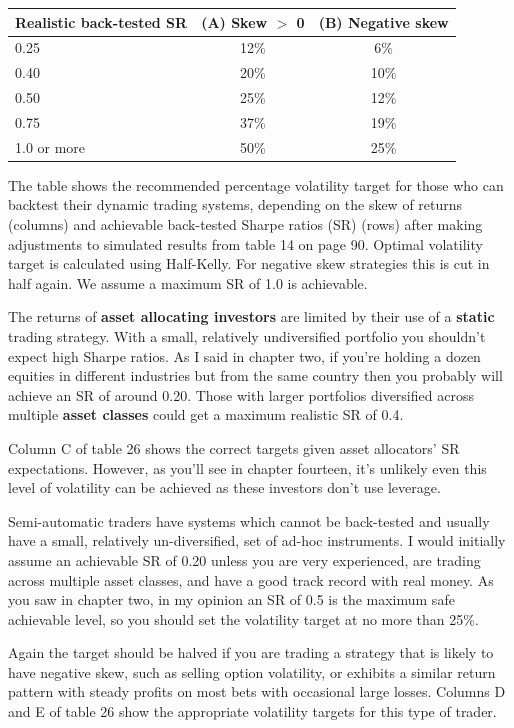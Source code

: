  \begingroup \small \centering \begin{tabular}{@{} lcc@{}}
\toprule
Realistic back-tested SR & (A) Skew $>$ 0 & (B) Negative skew \\
\midrule
0.25 & 12\% & 6\% \\
0.40 & 20\% & 10\% \\
0.50 & 25\% & 12\% \\
0.75 & 37\% & 19\% \\
1.0 or more & 50\% & 25\% \\
\bottomrule
\end{tabular}
\par \endgroup

The table shows the recommended percentage volatility target for those who can backtest their dynamic trading systems, depending on the skew of returns (columns) and achievable back-tested Sharpe ratios (SR) (rows) after making adjustments to simulated results from table 14 on page 90. Optimal volatility target is calculated using Half-Kelly. For negative skew strategies this is cut in half again. We assume a maximum SR of 1.0 is achievable.

The returns of \textbf{asset allocating investors} are limited by their use of a \textbf{static} trading strategy. With a small, relatively undiversified portfolio you shouldn't expect high Sharpe ratios. As I said in chapter two, if you're holding a dozen equities in different industries but from the same country then you probably will achieve an SR of around 0.20. Those with larger portfolios diversified across multiple \textbf{asset classes} could get a maximum realistic SR of 0.4.

Column C of table 26 shows the correct targets given asset allocators' SR expectations. However, as you'll see in chapter fourteen, it's unlikely even this level of volatility can be achieved as these investors don't use leverage.

Semi-automatic traders have systems which cannot be back-tested and usually have a small, relatively un-diversified, set of ad-hoc instruments. I would initially assume an achievable SR of 0.20 unless you are very experienced, are trading across multiple asset classes, and have a good track record with real money. As you saw in chapter two, in my opinion an SR of 0.5 is the maximum safe achievable level, so you should set the volatility target at no more than 25\%.

Again the target should be halved if you are trading a strategy that is likely to have negative skew, such as selling option volatility, or exhibits a similar return pattern with steady profits on most bets with occasional large losses. Columns D and E of table 26 show the appropriate volatility targets for this type of trader.

